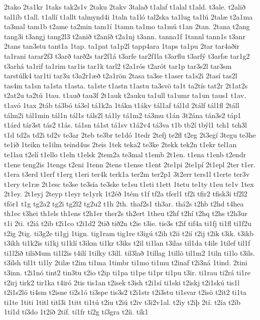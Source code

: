{2tako
2ta1kr
1taks
tak2s1v
2taku
2takv
3talað
t1alaf
t1alal
t1ald.
t3ale.
t2alið
tal1íb
t1all.
t1allí
t1allt
talmynd4i
1taln
ta1ló
tal2ska
ta1lug
ta1lú
2talæ
t2a1ma
ta3mal
tam1b
t2ame
ta2min
tam1í
1tamn
ta1mo
ta1mú
t1an
2tan.
2tana
t2ang
tang3i
t3angj
tang2l3
t2anið
t2aníð
t2a1nj
t3ann.
tanna1f
1tannl
tann1s
t3anr
2tans
tan3stu
tant1a
1tap.
ta1pat
ta1p2l
tapp4ara
1taps
ta1pu
2tar
tar4aðir
ta1rani
tarar2f3
t3arð
tarð2s
tar2f1á
t3arfe
tar2f1la
t3arflu
t3arfý
t3arfæ
tar1g2
t3arhá
ta1rif
ta1rim
tar1is
tar1k
tarl2
t2a1rós
t2arót
tar1p
tar3s2l
tar3sm
tarstúlk4
tar1ti
tar3u
t3a2r1æð
t2a1rön
2tasa
ta3se
t1aser
ta1s2i
2tasí
tas2l
tas4m
ta1sn
ta1sta
t1asta.
ta1ste
t1astn
t1astu
ta3svö
ta1t
ta2tís
tat2r
2t1at2s
t2at2u
ta2tú
1tau.
t1auð
tau3f
2t1auk
t2auku
ta1ull
ta1umr
ta1un
taus1
t1av.
t1avó
1tax
2táb
tá3bó
tá3el
tá1k2a
1tákn
t1ákv
tál1af
tál1d
2tálf
tál1fl
2táll
tálm2i
tál1min
tál1n
tál1s
táls2l
tá1ly
tá1m2
tá3mu
t1án
3t2ána
tán3s2
táp1
t1árd
tár3st
tás2
t1ás.
tá1sn
tá1st
tá1sv
t1á2v4
tá3va
t1b
tb2í
tbýl1
tch1
tch3l
t1d
td2a
td2i
td2v
te3ar
2teb
te3br
te1dó
1tedr
2tefj
te2fl
t2eg
2t3egí
3tegu
te3he
te1ið
1teikn
te1ilm
teind4us
2teis
1tek
teka2
te3ke
2tekk
tek2n
t1ekr
tel1an
te1lau
t2elí
t1ello
t1eln
t1elsk
2tem2a
te3mal
t1emb
2t1en.
t1ena
t1enb
t2endr
t1ene
teng2is
1tengs
t2eni
1tenn
2tens
t1ense
t1ent
2te1pi
2te1pí
2t1epl
2ter
t1er.
t1era
t3erd
t1erf
t1erg
t1eri
ter4k
terk1a
ter2m
ter2p1
3t2err
ters1l
t1erte
ter3v
t1ery
te1ræ
2t1esc
te3se
te3sía
te3ske
te1su
t1eti
t1ett
1tetu
te1ty
t1eu
te1v
1tex
2t1ey.
2t1eyj
2teyp
t1eyr
te1yrk
1t2éð
1tém
t1f
tf2a
tferl1
tf2i
tfir2
tfisk3i
tf2l2
tför1
t1g
tg2a2
tg2i
tg2l2
tg2u2
t1h
2th.
thaf2s1
th3ar.
thá2s
t2hb
t2hd
t4hea
th1ec
t3hei
th1els
th1ens
t2h1er
ther2s
th2ert
1theu
t2hf
t2hí
t2hq
t2hs
t2h3ur
t1i
2ti.
t2iá
t2ib
t2i1co
t2i1d2
2tið
tið2n
t2ie
t3ie.
tie3s
t2if
tif4a
ti1fj
ti1fl
ti1f2u
t2ig
2tig.
ti3g2e
ti1gj
1tign.
tig1ram
tig1re
t3igú
t2ih
t2ii
t2ií
t2ij
t2ik
t3ik.
t3ikb
t3ikh
ti1k2is
ti1kj
ti1klí
t3ikm
ti1kr
t3iks
t2il
ti1lan
t3ilas
til1da
t4ile
1tilef
til1f
ti1l2ið
tilið4um
ti1l2is
t4ilí
1tilky
t3ill.
til3lað
1tillag
1tillö
til1m2
1tiln
ti1lo
t3ils.
t3ilsh
til1t
ti1ly
2tilæ
t2im
ti1ma
1timbr
ti1mo
ti1mu
t2inaf
t2i3ná
1tind.
2tini
t3inn.
t2i1nó
tint2
tin3tu
t2io
t2ip
ti1pa
ti1pe
ti1pr
ti1pu
t3ir.
ti1rau
ti2rá
ti1re
t2irj
tirk2
tir1ka
t4iró
2tis
tis1an
t2isek
t3ish
t2i1sí
ti1ski
t2iskj
t2i1skú
tis1l
t2i1s2lö
ti4sm
t2isne
ti2s1ó
ti3spe
tis3s2
t2i1str
t2i3stu
ti1svar
t2isö
t2it2
ti1ta
ti1te
1titi
1titl
titl3i
1titt
ti1tú
t2iu
t2iú
t2iv
t3i2v1al.
t2iy
t2iþ
2tí.
t2ía
t2íb
1tí1d
tí3do
1t2íð
2tíf.
tí1fr
tí2g
tí3gra
t2íi.
tík1
}
